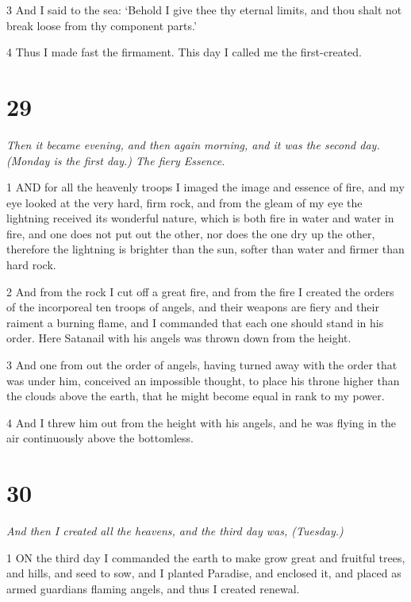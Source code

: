 \par 3 And I said to the sea: ‘Behold I give thee thy eternal limits, and thou shalt not break loose from thy component parts.’

\par 4 Thus I made fast the firmament. This day I called me the first-created.

\chapter{29}

\par \textit{Then it became evening, and then again morning, and it was the second day. (Monday is the first day.) The fiery Essence.}

\par 1 AND for all the heavenly troops I imaged the image and essence of fire, and my eye looked at the very hard, firm rock, and from the gleam of my eye the lightning received its wonderful nature, which is both fire in water and water in fire, and one does not put out the other, nor does the one dry up the other, therefore the lightning is brighter than the sun, softer than water and firmer than hard rock.

\par 2 And from the rock I cut off a great fire, and from the fire I created the orders of the incorporeal ten troops of angels, and their weapons are fiery and their raiment a burning flame, and I commanded that each one should stand in his order. Here Satanail with his angels was thrown down from the height.

\par 3 And one from out the order of angels, having turned away with the order that was under him, conceived an impossible thought, to place his throne higher than the clouds above the earth, that he might become equal in rank to my power.

\par 4 And I threw him out from the height with his angels, and he was flying in the air continuously above the bottomless.

\chapter{30}

\par \textit{And then I created all the heavens, and the third day was, (Tuesday.)}

\par 1 ON the third day I commanded the earth to make grow great and fruitful trees, and hills, and seed to sow, and I planted Paradise, and enclosed it, and placed as armed guardians flaming angels, and thus I created renewal.

